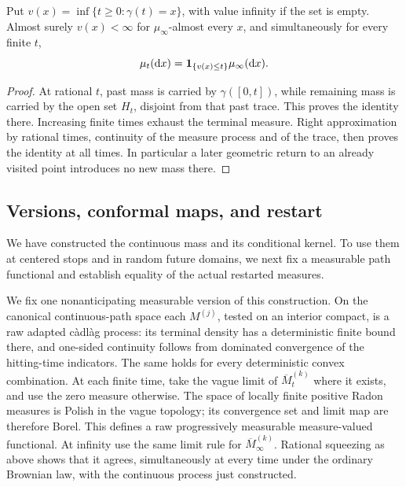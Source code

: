 \begin{corollary}
\label{mass:first-visit}
Put $v(x)=\inf\{t\ge0:\gamma(t)=x\}$, with value infinity if the set is
empty.  Almost surely $v(x)<\infty$ for $\mu_\infty$-almost every $x$, and
simultaneously for every finite $t$,
\begin{equation}
 \mu_t(\mathop{}\!\mathrm{d} x)=\mathbf 1_{\{v(x)\le t\}}\mu_\infty(\mathop{}\!\mathrm{d} x).
 \label{mass:first-visit-identity}
\end{equation}
\end{corollary}

\begin{proof}
At rational $t$, past mass is carried by $\gamma([0,t])$, while remaining
mass is carried by the open set $H_t$, disjoint from that past trace.
This proves the identity there.  Increasing finite times exhaust the
terminal measure.  Right approximation by rational times, continuity of
the measure process and of the trace, then proves the identity at all
times.  In particular a later geometric return to an already visited
point introduces no new mass there.
\end{proof}

\subsection{Versions, conformal maps, and restart}

We have constructed the continuous mass and its conditional kernel.
To use them at centered stops and in random future domains, we next
fix a measurable path functional and establish equality of the actual
restarted measures.

We fix one nonanticipating measurable version of this construction.
On the canonical continuous-path space each $M^{(j)}$, tested on an
interior compact, is a raw adapted c\`adl\`ag process: its terminal density
has a deterministic finite bound there, and one-sided continuity follows
from dominated convergence of the hitting-time indicators.
The same holds for every deterministic convex combination.
At each finite time, take the vague limit of $\overline M_t^{(k)}$
where it exists, and use the zero measure otherwise.  The space of
locally finite positive Radon measures is Polish in the vague topology;
its convergence set and limit map are therefore Borel.  This defines
a raw progressively measurable measure-valued functional.  At infinity use the same limit rule for
$\overline M_\infty^{(k)}$.  Rational squeezing as above shows that it
agrees, simultaneously at every time under the ordinary Brownian law,
with the continuous process just constructed.

